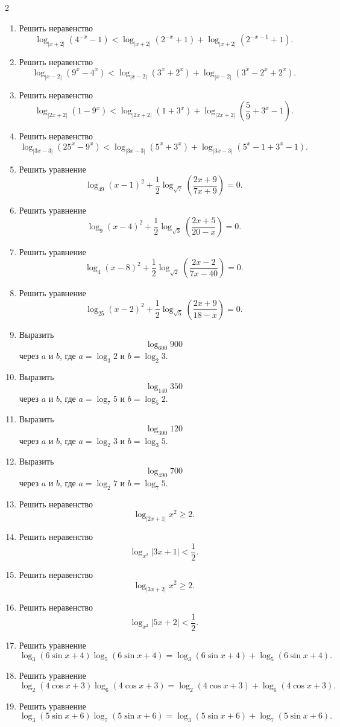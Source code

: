 \documentclass[14pt,a4paper,landscape]{article}
\begin{document}
\begin{multicols}{2}
\begin{enumerate}[label=3.\arabic*, leftmargin=1.5em]
    \item Решить неравенство $$\log_{|x+2|}(4^{-x}-1) < \log_{|x+2|}(2^{-x}+1) + \log_{|x+2|}(2^{-x-1}+1).$$
    \item Решить неравенство $$\log_{|x-2|}(9^x-4^x) < \log_{|x-2|}(3^x+2^x) + \log_{|x-2|}(3^x-2^x+2^x).$$
    \item Решить неравенство $$\log_{|2x+2|}(1-9^x) < \log_{|2x+2|}(1+3^x) + \log_{|2x+2|}\left(\frac{5}{9}+3^x-1\right).$$
    \item Решить неравенство $$\log_{|3x-3|}(25^x-9^x) < \log_{|3x-3|}(5^x+3^x) + \log_{|3x-3|}(5^x-1+3^x-1).$$
    \item Решить уравнение $$\log_{49}(x-1)^2 + \frac{1}{2}\log_{\sqrt{7}}\left(\frac{2x+9}{7x+9}\right) = 0.$$
    \item Решить уравнение $$\log_9(x-4)^2 + \frac{1}{2}\log_{\sqrt{3}}\left(\frac{2x+5}{20-x}\right) = 0.$$
    \item Решить уравнение $$\log_4(x-8)^2 + \frac{1}{2}\log_{\sqrt{2}}\left(\frac{2x-2}{7x-40}\right) = 0.$$
    \item Решить уравнение $$\log_{25}(x-2)^2 + \frac{1}{2}\log_{\sqrt{5}}\left(\frac{2x+9}{18-x}\right) = 0.$$
    \item Выразить $$\log_{600} 900$$ через $a$ и $b$, где $a = \log_3 2$ и $b = \log_2 3$.
    \item Выразить $$\log_{140} 350$$ через $a$ и $b$, где $a = \log_7 5$ и $b = \log_5 2$.
    \item Выразить $$\log_{300} 120$$ через $a$ и $b$, где $a = \log_2 3$ и $b = \log_3 5$.
    \item Выразить $$\log_{490} 700$$ через $a$ и $b$, где $a = \log_2 7$ и $b = \log_7 5$.
    \item Решить неравенство $$\log_{|2x+1|} x^2 \geqslant 2.$$
    \item Решить неравенство $$\log_{x^2}|3x+1| < \frac{1}{2}.$$
    \item Решить неравенство $$\log_{|3x+2|} x^2 \geqslant 2.$$
    \item Решить неравенство $$\log_{x^2}|5x+2| < \frac{1}{2}.$$
    \item Решить уравнение $$\log_3(6\sin x+4)\log_5(6\sin x+4) = \log_3(6\sin x+4) + \log_5(6\sin x+4).$$
    \item Решить уравнение $$\log_2(4\cos x+3)\log_6(4\cos x+3) = \log_2(4\cos x+3) + \log_6(4\cos x+3).$$
    \item Решить уравнение $$\log_3(5\sin x+6)\log_7(5\sin x+6) = \log_3(5\sin x+6) + \log_7(5\sin x+6).$$

\end{enumerate}
\end{multicols}
\end{document}
